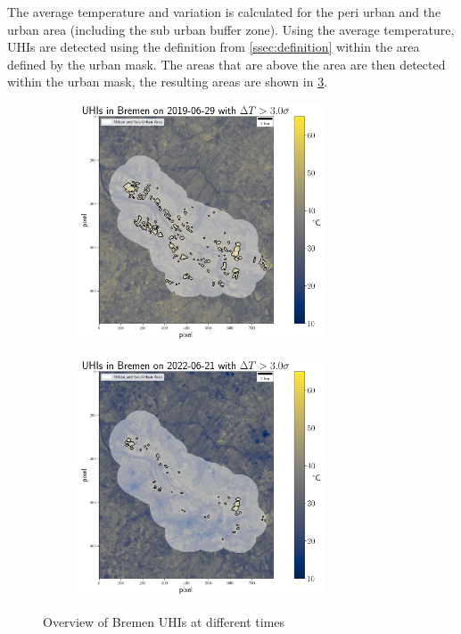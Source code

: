 \documentclass[12pt,a4paper, english,twoside]{scrartcl}
\begin{document}
        The average temperature and variation is calculated for the peri urban and the urban area (including the sub urban buffer zone).
        Using the average temperature, \glspl{UHI} are detected using the definition from \cref{ssec:definition} within the area defined by the urban mask. 
        The areas that are above the area are then detected within the urban mask, the resulting areas are shown in \cref{fig:AnalysisBre}. 
   \begin{figure}[!p]
       \begin{subfigure}{\textwidth}
          \centering
          \includegraphics[width=0.8\textwidth]{img/UHIs_Bremen_2019-06-29_s:3}
         \label{fig:uhis2019}
       \end{subfigure}

       \begin{subfigure}{\textwidth}
          \centering
          \includegraphics[width=0.8\textwidth]{img/UHIs_Bremen_2022-06-21_s:3}
         \label{fig:uhis2022}
       \end{subfigure}
         \caption{Overview of Bremen \glspl{UHI} at different times}\label{fig:AnalysisBre}
   \end{figure}
\end{document}
